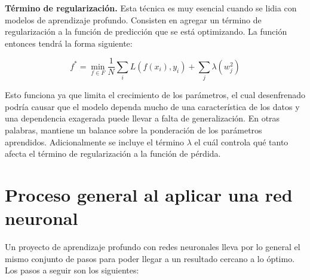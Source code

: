 \textbf{Término de regularización.} Esta técnica es muy esencial cuando se lidia con modelos de aprendizaje profundo. Consisten en agregar un término de regularización a la función de predicción que se está optimizando. La función entonces tendrá la forma siguiente: %

\[ f^* = \min_{f \in F} \frac{1}{N} \sum_{i} L(f(x_i), y_i) + \sum_{j} \lambda(w_j^2) \]

Esto funciona ya que limita el crecimiento de los parámetros, el cual desenfrenado podría causar que el modelo dependa mucho de una característica de los datos y una dependencia exagerada puede llevar a falta de generalización. En otras palabras, mantiene un balance sobre la ponderación de los parámetros aprendidos. Adicionalmente se incluye el término $\lambda$ el cuál controla qué tanto afecta el término de regularización a la función de pérdida.

\section{Proceso general al aplicar una red neuronal}
\label{sec:nlpprocess}

Un proyecto de aprendizaje profundo con redes neuronales lleva por lo general el mismo conjunto de pasos para poder llegar a un resultado cercano a lo óptimo. Los pasos a seguir son los siguientes:

